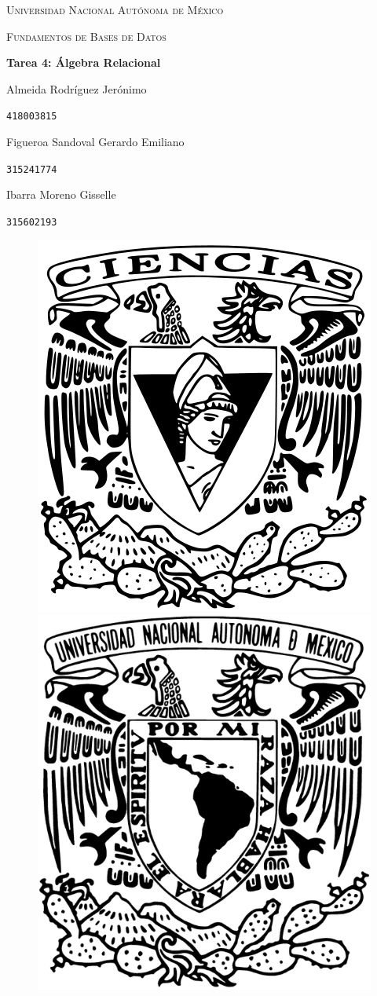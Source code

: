 \documentclass[a4paper, 12pt]{report}
\begin{document}
\begin{titlepage}
    \centering
    {\scshape\Huge Universidad Nacional Autónoma de México \par}
    \vspace{1.25cm}
    {\scshape\huge Fundamentos de Bases de Datos\par}
    \vspace{1.25cm}
    {\huge\bfseries Tarea 4: Álgebra Relacional\par}
    \vspace{1.25cm}
    {\Large\textsc Almeida Rodríguez Jerónimo\par}
    \vspace{.1cm}
    {\large\texttt{418003815}\par}
    \vspace{0.25cm}
    {\Large\textsc Figueroa Sandoval Gerardo Emiliano\par}
    \vspace{.1cm}
    {\large\texttt{315241774}\par}
    \vspace{0.25cm}
    {\Large\textsc Ibarra Moreno Gisselle \par}
    \vspace{.1cm}
    {\large\texttt{315602193}\par}
    \vspace{1.5cm}
    \vfill
    \begin{figure}[hb!]
        \includegraphics[width=.3\textwidth]
            {../logos/escudo_f-ciencias.png}\hfill
        \includegraphics[width=.3\textwidth]
            {../logos/Escudo_UNAM.png}\hfill
    \end{figure}
\end{titlepage}
\end{document}
